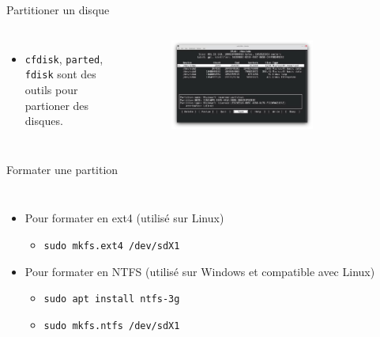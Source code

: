 \documentclass[aspectratio=169,xcolor=dvipsnames]{beamer}
\begin{document}
\begin{frame}{Partitioner un disque}
    \begin{columns}[c] %

        \begin{itemize}
            \item \texttt{cfdisk}, \texttt{parted}, \texttt{fdisk} sont des outils pour partioner des disques.
        \end{itemize}
        \begin{figure}
            \includegraphics[width=0.7\textwidth]{images/cfdisk.png}
        \end{figure}

    \end{columns}
\end{frame}

\begin{frame}{Formater une partition}
    \begin{columns}[c] %

        \begin{itemize}
            \item Pour formater en ext4 (utilisé sur Linux)
            \begin{itemize}
                \item \texttt{sudo mkfs.ext4 /dev/sdX1}
            \end{itemize}
            \item Pour formater en NTFS (utilisé sur Windows et compatible avec Linux)
                \begin{itemize}
                    \item \texttt{sudo apt install ntfs-3g}
                    \item \texttt{sudo mkfs.ntfs /dev/sdX1}
                \end{itemize}
        \end{itemize}

    \end{columns}
\end{frame}
\end{document}
